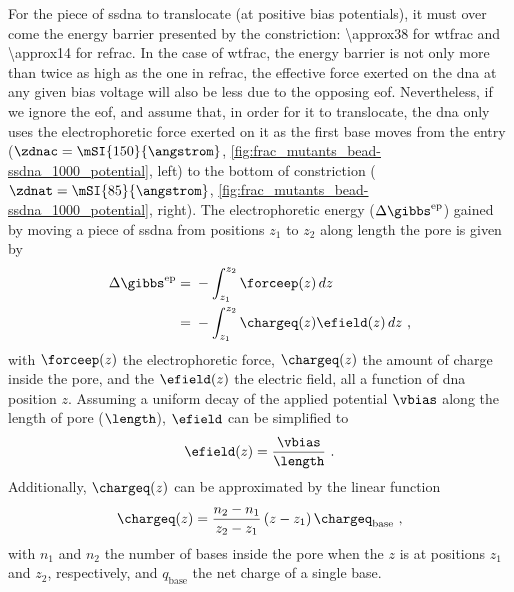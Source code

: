For the piece of \gls{ssdna} to translocate (at positive bias potentials), it must over come the energy
barrier presented by the constriction: \SI{\approx38}{\kT} for \gls{wtfrac} and \SI{\approx14}{\kT} for
\gls{refrac}. In the case of \gls{wtfrac}, the energy barrier is not only more than twice as high as the one
in \gls{refrac}, the effective force exerted on the \gls{dna} at any given bias voltage will also be less due
to the opposing \gls{eof}. Nevertheless, if we ignore the \gls{eof}, and assume that, in order for it to
translocate, the \gls{dna} only uses the electrophoretic force exerted on it as the first base moves from the
\cisi{} entry ($\zdnac = \mSI{150}{\angstrom}$, \cref{fig:frac_mutants_bead-ssdna_1000_potential}, left) to
the bottom of \transi{} constriction ($\zdnat = \mSI{85}{\angstrom}$,
\cref{fig:frac_mutants_bead-ssdna_1000_potential}, right). The electrophoretic energy ($\Delta
\gibbs^{\textrm{ep}}$) gained by moving a piece of \gls{ssdna} from positions $z_1$ to $z_2$ along length the
pore is given by
%
\begin{align}\label{eq:ep_energy}
  \Delta \gibbs^{\textrm{ep}} ={}& - \int_{z_1}^{z_2} \forceep (z) \,dz \nonumber \\
                              ={}& - \int_{z_1}^{z_2} \chargeq (z) \efield (z) \,dz
  \text{ ,}
\end{align}
%
with $\forceep (z)$ the electrophoretic force, $\chargeq (z)$ the amount of charge inside the pore, and the
$\efield (z)$ the electric field, all a function of \gls{dna} position $z$. Assuming a uniform decay of the
applied potential $\vbias$ along the length of pore ($\length$), $\efield$ can be simplified to
%
\begin{equation}\label{eq:linear_efield}
  \efield (z) = \dfrac{\vbias}{\length}
  \text{ .}
\end{equation}
%
Additionally, $\chargeq (z)$ can be approximated by the linear function
%
\begin{equation}\label{eq:ssdna_charge_in_pore}
  \chargeq (z) = 
        \dfrac{ n_2 - n_1 } { z_2 - z_1 } 
        \left( z - z_1 \right) \chargeq_{\textrm{base}}
  \text{ ,}
\end{equation}
%
with $n_1$ and $n_2$ the number of bases inside the pore when the $z$ is at positions $z_1$ and $z_2$,
respectively, and $q_{\textrm{base}}$ the net charge of a single base.

